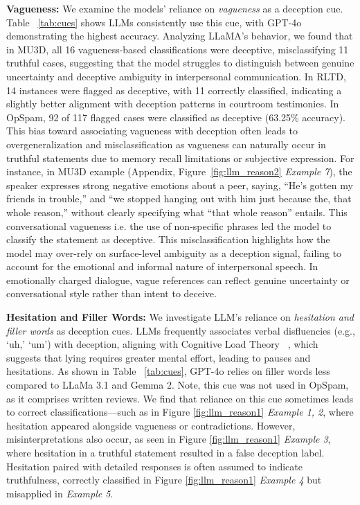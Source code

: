 \textbf{Vagueness:} We examine the models' reliance on \textit{vagueness} as a deception cue. Table ~\ref{tab:cues} shows LLMs consistently use this cue, with GPT-4o demonstrating the highest accuracy. Analyzing LLaMA’s behavior, we found that in MU3D, all 16 vagueness-based classifications were deceptive, misclassifying 11 truthful cases,  suggesting that the model struggles to distinguish between genuine uncertainty and deceptive ambiguity in interpersonal communication. In RLTD, 14 instances were flagged as deceptive, with 11 correctly classified, indicating a slightly better alignment with deception patterns in courtroom testimonies. In OpSpam, 92 of 117 flagged cases were classified as deceptive (63.25\% accuracy). This bias toward associating vagueness with deception often leads to overgeneralization and misclassification as vagueness can naturally occur in truthful statements due to memory recall limitations or subjective expression. For instance, in MU3D example (Appendix, Figure~\ref{fig:llm_reason2} \textit{Example 7}), the speaker expresses strong negative emotions about a peer, saying, “He’s gotten my friends in trouble,” and “we stopped hanging out with him just because the, that whole reason,” without clearly specifying what “that whole reason” entails. This conversational vagueness i.e. the use of non-specific phrases led the model to classify the statement as deceptive. This misclassification highlights how the model may over-rely on surface-level ambiguity as a deception signal, failing to account for the emotional and informal nature of interpersonal speech. In emotionally charged dialogue, vague references can reflect genuine uncertainty or conversational style rather than intent to deceive.

\textbf{Hesitation and Filler Words:} We investigate LLM’s reliance on \textit{hesitation and filler words} as deception cues. LLMs frequently associates verbal disfluencies (e.g., `uh,' `um') with deception, aligning with Cognitive Load Theory ~\cite{vrij2008detecting}, which suggests that lying requires greater mental effort, leading to pauses and hesitations. As shown in Table ~\ref{tab:cues}, GPT-4o relies on filler words less compared to LLaMa 3.1 and Gemma 2. Note, this cue was not used in OpSpam, as it comprises written reviews. We find that reliance on this cue sometimes leads to correct classifications—such as in Figure \ref{fig:llm_reason1} \textit{Example 1, 2}, where hesitation appeared alongside vagueness or contradictions. However, misinterpretations also occur, as seen in Figure \ref{fig:llm_reason1} \textit{Example 3}, where hesitation in a truthful statement resulted in a false deception label. Hesitation paired with detailed responses is often assumed to indicate truthfulness, correctly classified in Figure \ref{fig:llm_reason1} \textit{Example 4} but misapplied in \textit{Example 5}. 

